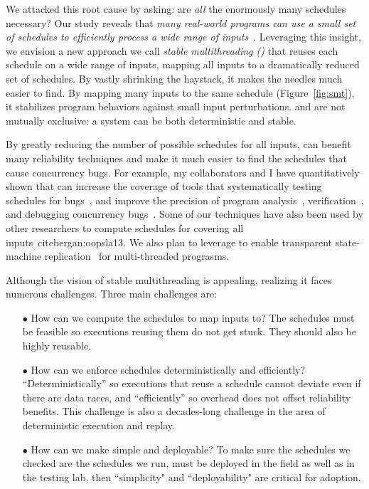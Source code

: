 We attacked this root cause by asking: are \emph{all} the enormously
many schedules necessary?  Our study reveals that \emph{many real-world
  programs can use a small set of schedules to efficiently process a wide
  range of inputs}~\cite{cui:tern:osdi10}.  Leveraging this insight, we
envision a new approach we call \emph{stable multithreading (\smt)}
that reuses each schedule on a wide range of inputs, mapping all inputs to a dramatically
reduced set of schedules. By vastly shrinking the haystack, it makes the
needles much easier to find.  By mapping many inputs to the same schedule (Figure~\ref{fig:smt}),
it stabilizes program behaviors against small input perturbations. 
\smt and \dmt are not mutually exclusive: a system can be both
deterministic and stable.

By greatly reducing the number of possible schedules for all inputs, \smt can benefit many reliability 
techniques and make it much easier to find the schedules that cause concurrency 
bugs. For example, my collaborators and I have quantitatively shown that \smt can 
increase the coverage of tools that systematically testing schedules for 
bugs~\cite{parrot:sosp13, dbug:spin11, modist:nsdi09}, and improve the precision 
of program analysis~\cite{wu:pldi12}, verification~\cite{wu:pldi12}, and 
debugging concurrency bugs~\cite{cui:tern:osdi10}. Some of our \smt techniques have 
also been used by other researchers to compute schedules for covering all 
inputs~cite{bergan:oopsla13}. We also plan to leverage \smt to enable transparent 
state-machine replication~\cite{paxos} for multi-threaded prograsms.

Although the vision of stable multithreading is appealing, realizing it
faces numerous challenges.  Three main challenges are:

\begin{enumerate}

\item[$\bullet$] How can we compute the schedules to map inputs to?  The 
schedules
  must be feasible so executions reusing them do not get stuck.
  They should also be highly reusable.

\item[$\bullet$] How can we enforce schedules deterministically and
  efficiently?  ``Deterministically'' so executions that reuse a schedule
  cannot deviate even if there are data races, and ``efficiently'' so
  overhead does not offset reliability benefits.
  This challenge is also a decades-long challenge in the area of
  deterministic execution and replay.

\item[$\bullet$] How can we make \smt simple and deployable? To make sure 
  the schedules we checked are the schedules we run, \smt must be 
 deployed in the field as well as in the testing lab, then ``simplicity" and 
 ``deployability" are critical for adoption.

\end{enumerate}

